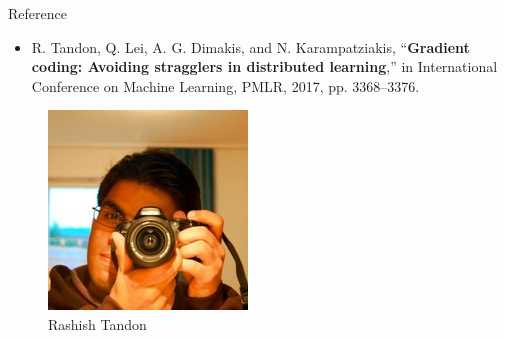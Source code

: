 \documentclass{beamer}
\begin{document}
\begin{frame}{Reference}

\begin{itemize}
    \item R. Tandon, Q. Lei, A. G. Dimakis, and N. Karampatziakis, “\textbf{Gradient coding: Avoiding stragglers in distributed learning},” in International Conference on Machine Learning, PMLR, 2017, pp. 3368–3376.
\end{itemize}

\begin{figure}
    \centering
    \begin{minipage}[t]{.2\paperwidth}
        \centering
        \includegraphics[width=\textwidth]{res/Rashish Tandon.jpg}
        \caption{Rashish Tandon}
    \end{minipage}
    \begin{minipage}[t]{.2\paperwidth}
        \centering

\end{minipage}
\end{figure}
\end{frame}
\end{document}
